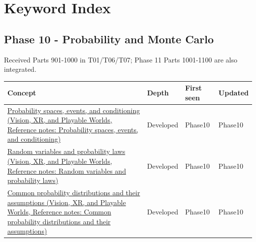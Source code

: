 \hypertarget{appendix-a6d556a4ef50}{}\label{referencestart:appendix-a6d556a4ef50}
\section{Keyword Index}\label{appendix-a6d556a4ef50-keyword-index}

\subsection{Phase 10 - Probability and Monte Carlo}\label{appendix-a6d556a4ef50-phase-10---probability-and-monte-carlo}

Received Parts 901-1000 in T01/T06/T07; Phase 11 Parts 1001-1100 are also integrated.

{\def\LTcaptype{none} %
\begin{longtable}[]{@{}
  >{\raggedright\arraybackslash}p{}
  >{\raggedright\arraybackslash}p{}
  >{\raggedright\arraybackslash}p{}
  >{\raggedright\arraybackslash}p{}@{}}
\toprule\noalign{}
\begin{minipage}[b]{\linewidth}\raggedright
Concept
\end{minipage} & \begin{minipage}[b]{\linewidth}\raggedright
Depth
\end{minipage} & \begin{minipage}[b]{\linewidth}\raggedright
First seen
\end{minipage} & \begin{minipage}[b]{\linewidth}\raggedright
Updated
\end{minipage} \\
\midrule\noalign{}
\endhead
\bottomrule\noalign{}
\endlastfoot
\href{../07-Vision-XR-and-Playable-Worlds/main.pdf\#nameddest=appendix-f1ef323f6ed7}{Probability spaces, events, and conditioning (Vision, XR, and Playable Worlds, Reference notes: Probability spaces, events, and conditioning)} & Developed & Phase10 & Phase10 \\
\href{../07-Vision-XR-and-Playable-Worlds/main.pdf\#nameddest=appendix-4d0203f7944f}{Random variables and probability laws (Vision, XR, and Playable Worlds, Reference notes: Random variables and probability laws)} & Developed & Phase10 & Phase10 \\
\href{../07-Vision-XR-and-Playable-Worlds/main.pdf\#nameddest=appendix-a2360b435383}{Common probability distributions and their assumptions (Vision, XR, and Playable Worlds, Reference notes: Common probability distributions and their assumptions)} & Developed & Phase10 & Phase10 \\

\end{longtable}}
